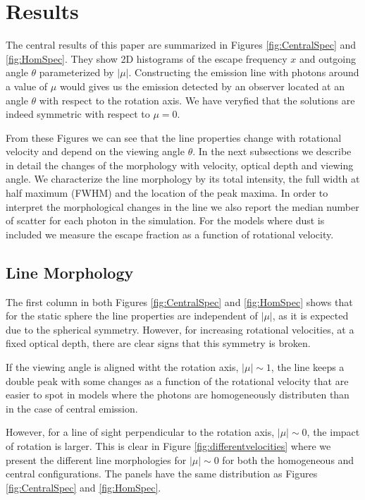 \documentclass{emulateapj}
\newcommand{\ly}{{\ifmmode{{\rm Ly}\alpha~}\else{Ly$\alpha$~}\fi}}
\begin{document}
\section{Results}
\label{sec:results}

The central results of this paper are summarized in Figures
\ref{fig:CentralSpec} and \ref{fig:HomSpec}. They show 2D histograms
of the escape frequency $x$ and outgoing angle $\theta$ parameterized by
$|\mu|$. Constructing the emission line with photons around a value
of $\mu$ would gives us the emission detected by an observer located at an
angle $\theta$ with respect to the rotation axis. We have veryfied
that the solutions are indeed symmetric with respect to $\mu=0$.  

From these Figures we can see that the line properties change with
rotational velocity and depend on the viewing angle $\theta$.  In the
next subsections we describe in  detail the changes of the morphology
with velocity, optical depth and viewing angle. We characterize the
line morphology by its total intensity, the full width at half maximum
(FWHM) and the location of the peak maxima. In order to interpret the
morphological changes in the line we also report the median number of
scatter for each \ly photon in the simulation. For the models where
dust is included we measure the escape fraction as a function of
rotational velocity.  

\subsection{Line Morphology}
\label{sec:angles}

The first column in both Figures \ref{fig:CentralSpec} and
\ref{fig:HomSpec} shows that for the static sphere the line properties
are independent of $|\mu|$, as it is expected due
to the spherical symmetry. However, for increasing rotational
velocities, at a fixed optical depth, there are clear signs that this
symmetry is broken. 

If the viewing angle is aligned witht the rotation axis, $|\mu|\sim
1$, the \ly line keeps a double peak with some changes as a function
of the rotational velocity that are easier to spot in models where the
\ly photons are homogeneously distributen than in the case of central
emission. 

However, for a line of sight perpendicular to the rotation
axis, $|\mu|\sim 0$, the impact of rotation is larger.  This is clear
in  Figure \ref{fig:differentvelocities} where we present the
different line morphologies for $|\mu|\sim 0$ for both the homogeneous
and central configurations. The panels have the same distribution as
Figures \ref{fig:CentralSpec} and \ref{fig:HomSpec}.  
\end{document}
